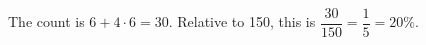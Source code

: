 The count is $ 6+4\cdot6=\boxed{30}$. Relative to 150, this is $\dfrac{30}{150}=\dfrac{1}{5}=\boxed{20\%}$.
